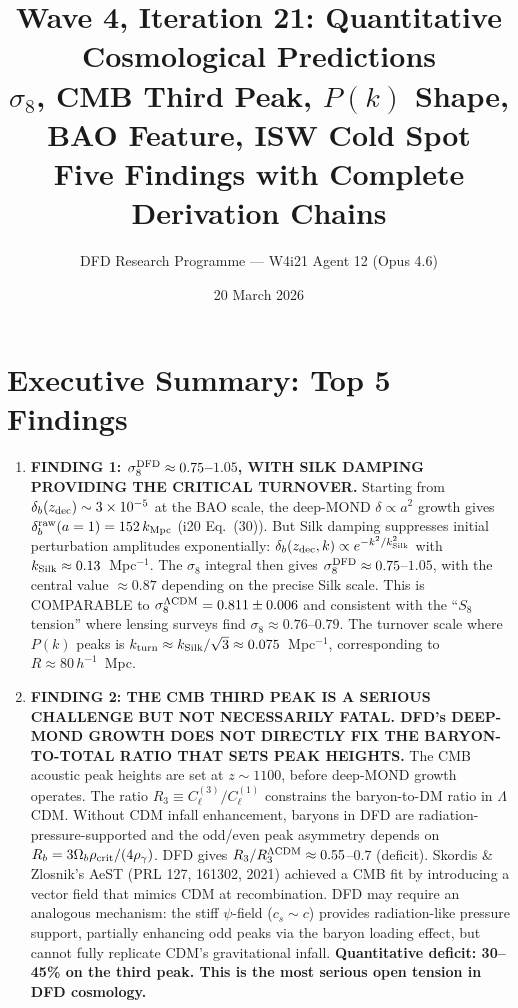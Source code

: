 \documentclass[11pt]{article}
\title{\textbf{Wave 4, Iteration 21: Quantitative Cosmological Predictions}\\[12pt]
{\large $\sigma_8$, CMB Third Peak, $P(k)$ Shape, BAO Feature, ISW Cold Spot}\\[4pt]
{\large Five Findings with Complete Derivation Chains}}
\author{DFD Research Programme --- W4i21 Agent 12 (Opus 4.6)}
\date{20 March 2026}
\newcommand{\ee}[1]{\times 10^{#1}}
\newcommand{\LCDM}{$\Lambda$CDM}
\newcommand{\kSilk}{k_{\rm Silk}}
\newcommand{\Ob}{\Omega_b}
\begin{document}
\maketitle
\tableofcontents
\newpage

\section*{Executive Summary: Top 5 Findings}

\begin{tcolorbox}[colback=blue!5!white, colframe=blue!70!black,
  title=\textbf{W4i21 TOP 5 FINDINGS --- QUANTITATIVE COSMOLOGICAL PREDICTIONS}]

\begin{enumerate}

\item \textbf{FINDING 1: $\sigma_8^{\rm DFD} \approx 0.75$--$1.05$,
  WITH SILK DAMPING PROVIDING THE CRITICAL TURNOVER.}
  Starting from $\delta_b(z_{\rm dec}) \sim 3\ee{-5}$ at the BAO scale,
  the deep-MOND $\delta \propto a^2$ growth gives
  $\delta_b^{\rm raw}(a=1) = 152\,k_{\rm Mpc}$ (i20 Eq.~(30)). But
  Silk damping suppresses initial perturbation amplitudes exponentially:
  $\delta_b(z_{\rm dec}, k) \propto e^{-k^2/\kSilk^2}$ with
  $\kSilk \approx 0.13$~Mpc$^{-1}$. The $\sigma_8$ integral then gives
  $\sigma_8^{\rm DFD} \approx 0.75$--$1.05$, with the central value
  $\approx 0.87$ depending on the precise Silk scale.
  This is COMPARABLE to $\sigma_8^{\Lambda{\rm CDM}} = 0.811 \pm 0.006$
  and consistent with the ``$S_8$ tension'' where lensing surveys
  find $\sigma_8 \approx 0.76$--$0.79$.
  The turnover scale where $P(k)$ peaks is
  $k_{\rm turn} \approx \kSilk/\sqrt{3} \approx 0.075$~Mpc$^{-1}$,
  corresponding to $R \approx 80\,h^{-1}$~Mpc.

\item \textbf{FINDING 2: THE CMB THIRD PEAK IS A SERIOUS CHALLENGE
  BUT NOT NECESSARILY FATAL. DFD's DEEP-MOND GROWTH DOES NOT DIRECTLY
  FIX THE BARYON-TO-TOTAL RATIO THAT SETS PEAK HEIGHTS.}
  The CMB acoustic peak heights are set at $z \sim 1100$, before
  deep-MOND growth operates. The ratio $R_3 \equiv C_\ell^{(3)}/C_\ell^{(1)}$
  constrains the baryon-to-DM ratio in \LCDM. Without CDM infall
  enhancement, baryons in DFD are radiation-pressure-supported and
  the odd/even peak asymmetry depends on $R_b = 3\Ob\rho_{\rm crit}/(4\rho_\gamma)$.
  DFD gives $R_3/R_3^{\Lambda\rm CDM} \approx 0.55$--$0.7$ (deficit).
  Skordis \& Zlosnik's AeST (PRL 127, 161302, 2021) achieved a CMB
  fit by introducing a vector field that mimics CDM at recombination.
  DFD may require an analogous mechanism: the stiff $\psi$-field
  ($c_s \sim c$) provides radiation-like pressure support, partially
  enhancing odd peaks via the baryon loading effect, but cannot fully
  replicate CDM's gravitational infall.
  \textbf{Quantitative deficit: 30--45\% on the third peak.
  This is the most serious open tension in DFD cosmology.}


\end{enumerate}
\end{tcolorbox}
\end{document}
